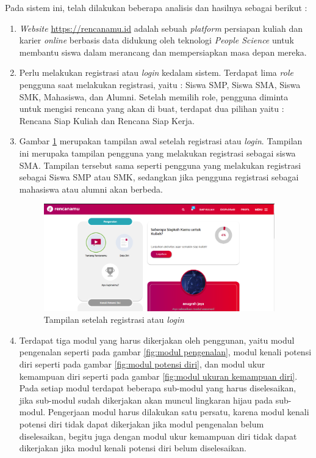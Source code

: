 Pada sistem ini, telah dilakukan beberapa analisis dan hasilnya sebagai berikut :

\begin{enumerate}
    \item \textit{Website} \url{https://rencanamu.id} adalah sebuah \textit{platform} persiapan kuliah dan karier \textit{online} berbasis data didukung oleh teknologi \textit{People Science} untuk membantu siswa dalam merancang dan mempersiapkan masa depan mereka. 
    
    \item Perlu melakukan registrasi atau \textit{login} kedalam sistem. Terdapat lima \textit{role} pengguna saat melakukan registrasi, yaitu : Siswa SMP, Siswa SMA, Siswa SMK, Mahasiswa, dan Alumni. Setelah memilih role, pengguna diminta untuk mengisi rencana yang akan di buat, terdapat dua pilihan yaitu : Rencana Siap Kuliah dan Rencana Siap Kerja.
    
    \item Gambar \ref{fig: tampilan setelah regis atau login} merupakan tampilan awal setelah registrasi atau \textit{login}. Tampilan ini merupaka tampilan pengguna yang melakukan registrasi sebagai siswa SMA. Tampilan tersebut sama seperti pengguna yang melakukan registrasi sebagai Siswa SMP atau SMK, sedangkan jika pengguna registrasi sebagai mahasiswa atau alumni akan berbeda.
    
    \begin{figure}[H]
        \centering
        \includegraphics[width = 10cm, height = 6 cm]{Gambar/gambar32.PNG}
        \caption{Tampilan setelah registrasi atau \textit{login}}
        \label{fig: tampilan setelah regis atau login}
    \end{figure}
    
    \item Terdapat tiga modul yang harus dikerjakan oleh penggunan, yaitu modul pengenalan seperti pada gambar \ref{fig:modul pengenalan}, modul kenali potensi diri seperti pada gambar \ref{fig:modul potensi diri}, dan modul ukur kemampuan diri seperti pada gambar \ref{fig:modul ukuran kemampuan diri}. Pada setiap modul terdapat beberapa sub-modul yang harus diselesaikan, jika sub-modul sudah dikerjakan akan muncul lingkaran hijau pada sub-modul. Pengerjaan modul harus dilakukan satu persatu, karena modul kenali potensi diri tidak dapat dikerjakan jika modul pengenalan belum diselesaikan, begitu juga dengan modul ukur kemampuan diri tidak dapat dikerjakan jika modul kenali potensi diri belum diselesaikan.
    

\end{enumerate}
